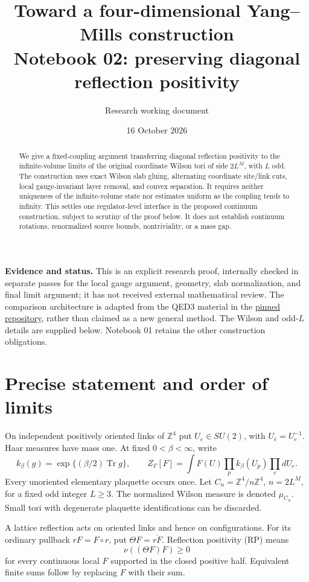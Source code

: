 \documentclass[11pt]{article}
\title{Toward a four-dimensional Yang--Mills construction\\
\large Notebook 02: preserving diagonal reflection positivity}
\author{Research working document}
\date{16 October 2026}
\theoremstyle{remark}
\newcommand{\tr}{\operatorname{Tr}}
\newcommand{\Z}{\mathbb Z}
\begin{document}
\maketitle
\begin{abstract}
We give a fixed-coupling argument transferring diagonal reflection
positivity to the infinite-volume limits of the original coordinate
Wilson tori of side $2L^M$, with $L$ odd. The construction uses exact
Wilson slab gluing, alternating coordinate site/link cuts, local
gauge-invariant layer removal, and convex separation. It requires
neither uniqueness of the infinite-volume state nor estimates uniform
as the coupling tends to infinity. This settles one regulator-level
interface in the proposed continuum construction, subject to scrutiny
of the proof below. It does not establish continuum rotations,
renormalized source bounds, nontriviality, or a mass gap.
\end{abstract}

\noindent\textbf{Evidence and status.}
This is an explicit research proof, internally checked in separate
passes for the local gauge argument, geometry, slab normalization, and
final limit argument; it has not received external mathematical review.
The comparison architecture is adapted from the QED3 material in the
\href{https://github.com/ethanwsussman/Yang--Mills-LLM-experiment/tree/e392ef45013a581664bab76b90867170b30fe10e}
{pinned repository}, rather than claimed as a new general method.
The Wilson and odd-$L$ details are supplied below. Notebook 01 retains
the other construction obligations.

\section{Precise statement and order of limits}

On independent positively oriented links of $\Z^4$ put $U_e\in SU(2)$,
with $U_{\bar e}=U_e^{-1}$. Haar measures have mass one. At fixed
$0<\beta<\infty$, write
\[
 k_\beta(g)=\exp\{(\beta/2)\tr g\},\qquad
 Z_\Gamma[F]=\int F(U)\prod_{p}k_\beta(U_p)\prod_e dU_e.
 \tag{1.1}
\]
Every unoriented elementary plaquette occurs once. Let
$C_n=\Z^4/n\Z^4$, $n=2L^M$, for a fixed odd integer $L\ge3$.
The normalized Wilson measure is denoted $\mu_{C_n}$.
Small tori with degenerate plaquette identifications can be discarded.

A lattice reflection acts on oriented links and hence on configurations.
For its ordinary pullback $rF=F\circ r$, put
$\Theta F=\overline{rF}$. Reflection positivity (RP) means
\[
 \nu((\Theta F)F)\ge0
 \tag{1.2}
\]
for every continuous local $F$ supported in the closed positive half.
Equivalent finite sums follow by replacing $F$ with their sum.
\end{document}
